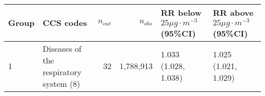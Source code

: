 \begin{tabular}{lp{6.5cm}rrp{2.2cm}p{2.2cm}}
  \hline
Group & CCS codes & $n_{out}$ & $n_{obs}$ & RR below $25 \mu g \cdot m^{-3}$ (95\%CI) & RR above $25 \mu g \cdot m^{-3}$ (95\%CI) \\ 
  \hline
   1 & Diseases of the respiratory system (8) &   32 & 1,788,913 & 1.033 (1.028, 1.038) & 1.025 (1.021, 1.029) \\ 
   \hline
\end{tabular}


